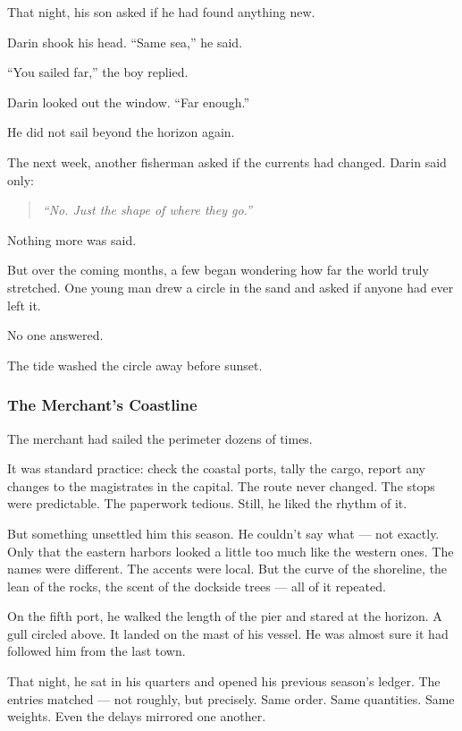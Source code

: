 \documentclass[12pt]{article}
\begin{document}
That night, his son asked if he had found anything new.

Darin shook his head. ``Same sea,'' he said.

``You sailed far,'' the boy replied.

Darin looked out the window. ``Far enough.''

He did not sail beyond the horizon again.

The next week, another fisherman asked if the currents had changed. Darin said only:

\begin{quote}
\emph{``No. Just the shape of where they go.''}
\end{quote}

Nothing more was said.

But over the coming months, a few began wondering how far the world truly stretched. One young man drew a circle in the sand and asked if anyone had ever left it.

No one answered.

The tide washed the circle away before sunset.

\dotfill

\subsubsection{The Merchant’s Coastline}

The merchant had sailed the perimeter dozens of times.

It was standard practice: check the coastal ports, tally the cargo, report any changes to the magistrates in the capital. The route never changed. The stops were predictable. The paperwork tedious. Still, he liked the rhythm of it.

But something unsettled him this season. He couldn’t say what — not exactly. Only that the eastern harbors looked a little too much like the western ones. The names were different. The accents were local. But the curve of the shoreline, the lean of the rocks, the scent of the dockside trees — all of it repeated.

On the fifth port, he walked the length of the pier and stared at the horizon. A gull circled above. It landed on the mast of his vessel. He was almost sure it had followed him from the last town.

That night, he sat in his quarters and opened his previous season’s ledger. The entries matched — not roughly, but precisely. Same order. Same quantities. Same weights. Even the delays mirrored one another.
\end{document}
